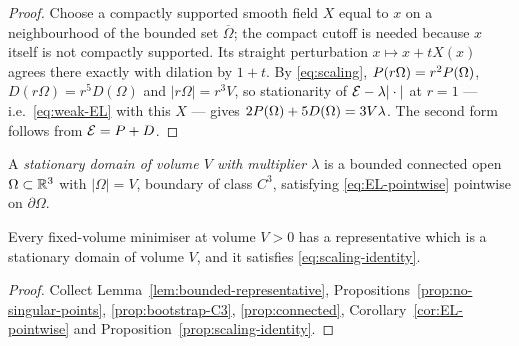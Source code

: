 \begin{proof}
Choose a compactly supported smooth field $X$ equal to $x$ on a neighbourhood
of the bounded set $\overline\Omega$; the compact cutoff is needed because $x$
itself is not compactly supported.  Its straight perturbation
$x\mapsto x+tX(x)$ agrees there exactly with dilation by $1+t$.  By
\eqref{eq:scaling},
$P(r\Omega)=r^2P(\Omega)$, $D(r\Omega)=r^5D(\Omega)$ and
$|r\Omega|=r^3V$, so stationarity of $\mathcal E-\lambda|\cdot|$ at $r=1$ ---
i.e.\ \eqref{eq:weak-EL} with this $X$ --- gives
$2P(\Omega)+5D(\Omega)=3V\lambda$.  The second form follows from
$\mathcal E=P+D$.
\end{proof}

\begin{definition}\label{def:stationary}
A \emph{stationary domain of volume $V$ with multiplier $\lambda$} is a
bounded connected open $\Omega\subset\mathbb R^3$ with $|\Omega|=V$, boundary of
class $C^3$, satisfying \eqref{eq:EL-pointwise} pointwise on
$\partial\Omega$.
\end{definition}

\begin{corollary}\label{cor:minimizer-stationary}
Every fixed-volume minimiser at volume $V>0$ has a representative which is a
stationary domain of volume $V$, and it satisfies
\eqref{eq:scaling-identity}.
\end{corollary}

\begin{proof}
Collect Lemma~\ref{lem:bounded-representative},
Propositions~\ref{prop:no-singular-points}, \ref{prop:bootstrap-C3},
\ref{prop:connected}, Corollary~\ref{cor:EL-pointwise} and
Proposition~\ref{prop:scaling-identity}.
\end{proof}

